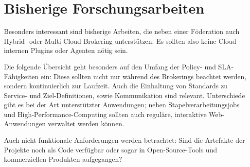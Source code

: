 



%
%

%
%
%
%
%



\section{Bisherige Forschungsarbeiten}


Besonders interessant sind bisherige Arbeiten, die neben einer Föderation auch Hybrid- oder Multi-Cloud-Brokering unterstützen. Es sollten also keine Cloud-internen Plugins oder Agenten nötig sein.

Die folgende Übersicht geht besonders auf den Umfang der Policy- und SLA-Fähigkeiten ein: Diese sollten nicht nur während des Brokerings beachtet werden, sondern kontinuierlich zur Laufzeit. Auch die Einhaltung von Standards zu Service- und Ziel-Definitionen, sowie Kommunikation sind relevant. Unterschiede gibt es bei der Art unterstützter Anwendungen; neben Stapelverarbeitungsjobs und High-Performance-Computing sollten auch reguläre, interaktive Web-Anwendungen verwaltet werden können. 

Auch nicht-funktionale Anforderungen werden betrachtet: Sind die Artefakte der Projekte noch als Code verfügbar oder sogar in Open-Source-Tools und kommerziellen Produkten aufgegangen?

